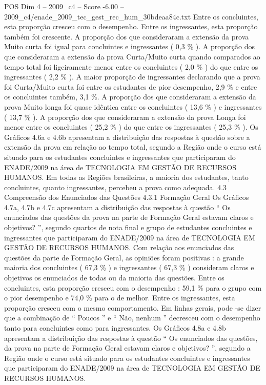 \begin{textsample}{POS Dim 4 – 2009\_c4 – Score -6.00 – 2009\_c4/enade\_2009\_tec\_gest\_rec\_hum\_30bdeaa84c.txt}
Entre os concluintes, esta proporção cresceu com o desempenho.
Entre os ingressantes, esta proporção também foi crescente.
A proporção dos que consideraram a extensão da prova Muito curta foi igual para concluintes e ingressantes ( 0,3 \% ).
A proporção dos que consideraram a extensão da prova Curta/Muito curta quando comparados ao tempo total foi ligeiramente menor entre os concluintes ( 2,0 \% ) do que entre os ingressantes ( 2,2 \% ).
A maior proporção de ingressantes declarando que a prova foi Curta/Muito curta foi entre os estudantes de pior desempenho, 2,9 \% e entre os concluintes também, 3,1 \%.
A proporção dos que consideraram a extensão da prova Muito longa foi quase idêntica entre os concluintes ( 13,6 \% ) e ingressantes ( 13,7 \% ).
A proporção dos que consideraram a extensão da prova Longa foi menor entre os concluintes ( 25,2 \% ) do que entre os ingressantes ( 25,3 \% ).
Os Gráficos 4.6a e 4.6b apresentam a distribuição das respostas à questão sobre a extensão da prova em relação ao tempo total, segundo a Região onde o curso está situado para os estudantes concluintes e ingressantes que participaram do ENADE/2009 na área de TECNOLOGIA EM GESTÃO DE RECURSOS HUMANOS.
Em todas as Regiões brasileiras, a maioria dos estudantes, tanto concluintes, quanto ingressantes, percebeu a prova como adequada. 4.3 Compreensão dos Enunciados das Questões 4.3.1 Formação Geral Os Gráficos 4.7a, 4.7b e 4.7c apresentam a distribuição das respostas à questão “ Os enunciados das questões da prova na parte de Formação Geral estavam claros e objetivos? ”, segundo quartos de nota final e grupo de estudantes concluintes e ingressantes que participaram do ENADE/2009 na área de TECNOLOGIA EM GESTÃO DE RECURSOS HUMANOS.
Com relação aos enunciados das questões da parte de Formação Geral, as opiniões foram positivas : a grande maioria dos concluintes ( 67,3 \% ) e ingressantes ( 67,3 \% ) consideram claros e objetivos os enunciados de todas ou da maioria das questões.
Entre os concluintes, esta proporção cresceu com o desempenho : 59,1 \% para o grupo com o pior desempenho e 74,0 \% para o de melhor.
Entre os ingressantes, esta proporção cresceu com o mesmo comportamento.
Em linhas gerais, pode -se dizer que a combinação de “ Poucos ” e “ Não, nenhum ” decresceu com o desempenho tanto para concluintes como para ingressantes.
Os Gráficos 4.8a e 4.8b apresentam a distribuição das respostas à questão “ Os enunciados das questões, da prova na parte de Formação Geral estavam claros e objetivos? ”, segundo a Região onde o curso está situado para os estudantes concluintes e ingressantes que participaram do ENADE/2009 na área de TECNOLOGIA EM GESTÃO DE RECURSOS HUMANOS.

\end{textsample}
